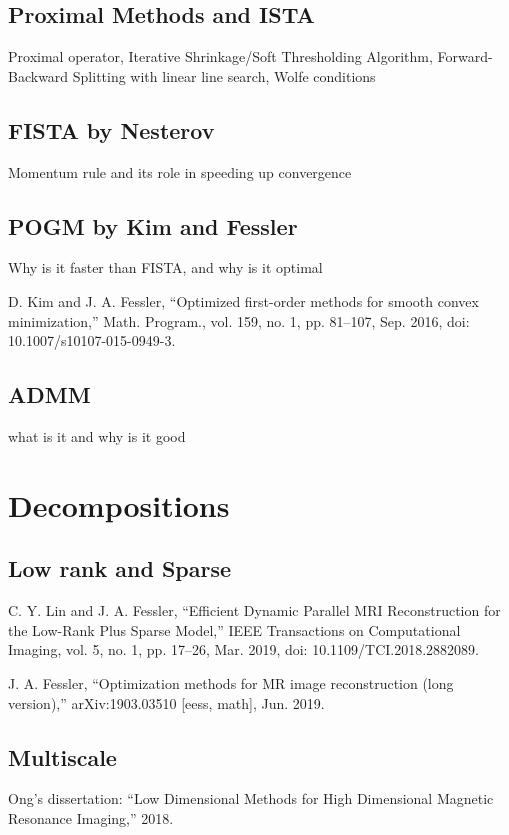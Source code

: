 \subsection{Proximal Methods and ISTA}
Proximal operator, Iterative Shrinkage/Soft Thresholding Algorithm, Forward-Backward Splitting with linear line search, Wolfe conditions

\subsection{FISTA by Nesterov}
Momentum rule and its role in speeding up convergence

\subsection{POGM by Kim and Fessler}
Why is it faster than FISTA, and why is it optimal

D. Kim and J. A. Fessler, “Optimized first-order methods for smooth convex minimization,” Math. Program., vol. 159, no. 1, pp. 81–107, Sep. 2016, doi: 10.1007/s10107-015-0949-3.

\subsection{ADMM}
what is it and why is it good

\section{Decompositions}

\subsection{Low rank and Sparse}
C. Y. Lin and J. A. Fessler, “Efficient Dynamic Parallel MRI Reconstruction for the Low-Rank Plus Sparse Model,” IEEE Transactions on Computational Imaging, vol. 5, no. 1, pp. 17–26, Mar. 2019, doi: 10.1109/TCI.2018.2882089.

J. A. Fessler, “Optimization methods for MR image reconstruction (long version),” arXiv:1903.03510 [eess, math], Jun. 2019.

\subsection{Multiscale}

Ong's dissertation: “Low Dimensional Methods for High Dimensional Magnetic Resonance Imaging,” 2018.

